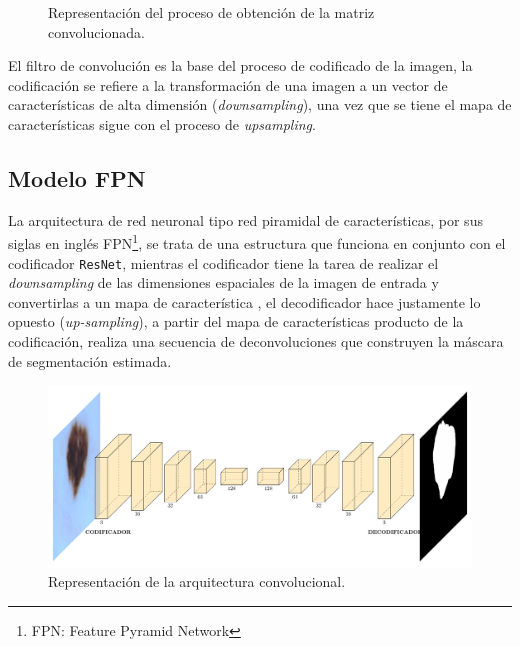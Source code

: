 \begin{figure}[b]
    \centering
    \caption{Representación del proceso de obtención de la matriz convolucionada.}
\end{figure}

El filtro de convolución es la base del proceso de codificado de la imagen, la codificación se refiere a la transformación de una imagen a un vector de características de alta dimensión (\emph{downsampling}), una vez que se tiene el mapa de características sigue con el proceso de \emph{upsampling}.

\subsection{Modelo FPN}
La arquitectura de red neuronal tipo red piramidal de características, por sus siglas en inglés FPN\footnote{FPN: Feature Pyramid Network}, se trata de una estructura que funciona en conjunto con el codificador \texttt{ResNet}, mientras el codificador tiene la tarea de realizar el \emph{downsampling} de las dimensiones espaciales de la imagen de entrada y convertirlas a un mapa de característica , el decodificador hace justamente lo opuesto (\emph{up-sampling}), a partir del mapa de características producto de la codificación, realiza una secuencia de deconvoluciones que construyen la máscara de segmentación estimada.

\begin{figure}[h]
    \centering
    \includegraphics[scale=0.45]{Figuras/FPN_es.pdf}
    \caption{Representación de la arquitectura convolucional.}
    \label{fig:fpn_map}
\end{figure}

